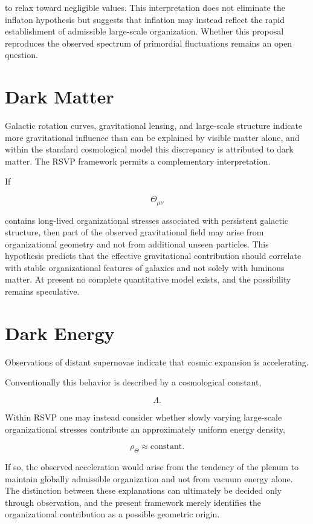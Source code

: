 \documentclass[11pt,oneside]{book}
\numberwithin{equation}{chapter}
\theoremstyle{definition}
\theoremstyle{plain}
\begin{document}
to relax toward negligible values. This interpretation does not eliminate the inflaton hypothesis but suggests that inflation may instead reflect the rapid establishment of admissible large-scale organization. Whether this proposal reproduces the observed spectrum of primordial fluctuations remains an open question.

\section{Dark Matter}

Galactic rotation curves, gravitational lensing, and large-scale structure indicate more gravitational influence than can be explained by visible matter alone, and within the standard cosmological model this discrepancy is attributed to dark matter. The RSVP framework permits a complementary interpretation.

If

\[
\Theta_{\mu\nu}
\]

contains long-lived organizational stresses associated with persistent galactic structure, then part of the observed gravitational field may arise from organizational geometry and not from additional unseen particles. This hypothesis predicts that the effective gravitational contribution should correlate with stable organizational features of galaxies and not solely with luminous matter. At present no complete quantitative model exists, and the possibility remains speculative.

\section{Dark Energy}

Observations of distant supernovae indicate that cosmic expansion is
accelerating.

Conventionally this behavior is described by a cosmological constant,

\[
\Lambda.
\]

Within RSVP one may instead consider whether slowly varying large-scale
organizational stresses contribute an approximately uniform energy density,

\[
\rho_\Theta
\approx
\text{constant}.
\]

If so, the observed acceleration would arise from the tendency of the plenum to maintain globally admissible organization and not from vacuum energy alone. The distinction between these explanations can ultimately be decided only through observation, and the present framework merely identifies the organizational contribution as a possible geometric origin.
\end{document}
